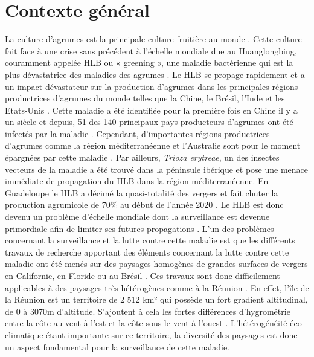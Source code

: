 \documentclass[
  11pt,
  french,
  a4paper,
  extrafontsizes,onecolumn,openright
  ]{memoir}
\begin{document}
\vspace*{4cm}

\hypertarget{contexte-guxe9nuxe9ral}{%
\section{Contexte général}\label{contexte-guxe9nuxe9ral}}

La culture d'agrumes est la principale culture fruitière au monde \autocite{comte_apport_2013}. Cette culture fait face à une crise sans précédent à l'échelle mondiale due au Huanglongbing, couramment appelée HLB ou « greening », une maladie bactérienne qui est la plus dévastatrice des maladies des agrumes \autocite{moriya_detecting_2019}. Le HLB se propage rapidement et a un impact dévastateur sur la production d'agrumes dans les principales régions productrices d'agrumes du monde telles que la Chine, le Brésil, l'Inde et les Etats-Unis \autocite{deng_detection_2020}. Cette maladie a été identifiée pour la première fois en Chine il y a un siècle et depuis, 51 des 140 principaux pays producteurs d'agrumes ont été infectés par la maladie \autocite{moriya_detecting_2019}. Cependant, d'importantes régions productrices d'agrumes comme la région méditerranéenne et l'Australie sont pour le moment épargnées par cette maladie \autocite{gutierrez_prospective_2013}. Par ailleurs, \emph{Trioza erytreae}, un des insectes vecteurs de la maladie a été trouvé dans la péninsule ibérique et pose une menace immédiate de propagation du HLB dans la région méditerranéenne. En Guadeloupe le HLB a décimé la quasi-totalité des vergers et fait chuter la production agrumicole de 70\% au début de l'année 2020 \autocite{morillon_huanglongbing_2020}. Le HLB est donc devenu un problème d'échelle mondiale dont la surveillance est devenue primordiale afin de limiter ses futures propagations \autocite{wang_citrus_2019}.
\vfill
\newpage
L'un des problèmes concernant la surveillance et la lutte contre cette maladie est que les différents travaux de recherche apportant des éléments concernant la lutte contre cette maladie ont été menés sur des paysages homogènes de grandes surfaces de vergers en Californie, en Floride ou au Brésil \autocite{narouei-khandan_global_2016}.
Ces travaux sont donc difficilement applicables à des paysages très hétérogènes comme à la Réunion \autocite{gottwald_current_2010}.
En effet, l'île de la Réunion est un territoire de 2 512 km² qui possède un fort gradient altitudinal, de 0 à 3070m d'altitude. S'ajoutent à cela les fortes différences d'hygrométrie entre la côte au vent à l'est et la côte sous le vent à l'ouest \autocite{guilloteau_utilisation_2018}. L'hétérogénéité éco-climatique étant importante sur ce territoire, la diversité des paysages est donc un aspect fondamental pour la surveillance de cette maladie.
\end{document}
